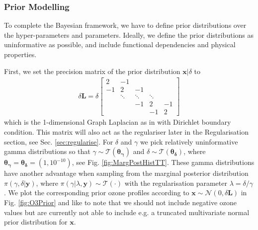 \subsubsection{Prior Modelling}
To complete the Bayesian framework, we have to define prior distributions over the hyper-parameters and parameters.
Ideally, we define the prior distributions as uninformative as possible, and include functional dependencies and physical properties.

First, we set the precision matrix of the prior distribution $\bm{x}|\delta$ to
\begin{align}
	\delta \bm{L} =
	\delta
	\begin{bmatrix}
		2 & -1 & & &  \\
		-1 & 2 & -1 & &   \\
		& \ddots & \ddots & \ddots &\\ 
		& & -1 & 2 & -1  \\
		& & & -1 & 2 
	\end{bmatrix} 
	\label{eq:GLapl} 
\end{align}
which is the 1-dimensional Graph Laplacian as in \cite{wang2015graphs,fox2016fast} with Dirichlet boundary condition.
This matrix will also act as the regulariser later in the Regularisation section, see Sec. \ref{sec:regularise}.
For $\delta$ and $\gamma$ we pick  relatively uninformative gamma distributions so that $\gamma \sim \mathcal{T}(\bm{\theta_{\gamma}}) $ and $\delta \sim \mathcal{T}(\bm{\theta_{\delta}})$, where $\bm{\theta_{\gamma}} = \bm{\theta_{\delta}} = (1,10^{-10})$, see Fig. \ref{fig:MargPostHistTT}.
These gamma distributions have another advantage when sampling from the marginal posterior distribution $\pi(\gamma,\delta | \bm{y})$, where $\pi(\gamma | \lambda, \bm{y}) \sim \mathcal{T}(\cdot)$ with the regularisation parameter $\lambda = \delta / \gamma $.
We plot the corresponding prior ozone profiles according to $\bm{x}\sim \mathcal{N}(0, \delta \bm{L})$ in Fig. \ref{fig:O3Prior} and like to note that we should not include negative ozone values but are currently not able to include e.g. a truncated multivariate normal prior distribution for $\bm{x}$. 



